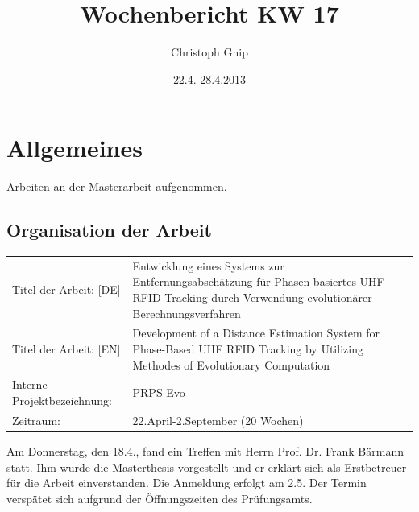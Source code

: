 \documentclass[a4paper,12pt,fleqn]{scrartcl}
\title{Wochenbericht KW 17}
\author{Christoph Gnip}
\date{ 22.4.-28.4.2013 }
\begin{document}
\setlength{\headheight}{36pt}

\begin{titlepage}

\maketitle

\thispagestyle{empty}



\end{titlepage}

\section[Allgemeines]{Allgemeines}
Arbeiten an der Masterarbeit aufgenommen.
\subsection{Organisation der Arbeit}
\begin{table}[right]
    \renewcommand{\arraystretch}{1.5}
    \begin{tabular}{lp{11cm}}
      Titel der Arbeit:  [DE] & Entwicklung eines Systems zur
Entfernungsabschätzung für Phasen basiertes UHF RFID Tracking durch Verwendung
evolutionärer Berechnungsverfahren \\
      Titel der Arbeit:  [EN] & Development of a Distance Estimation System for
Phase-Based UHF RFID Tracking by Utilizing Methodes of Evolutionary Computation
\\
      Interne Projektbezeichnung: & PRPS-Evo      \\
      Zeitraum: & 22.April-2.September (20 Wochen)
    \end{tabular}
\end{table}
%
Am Donnerstag, den 18.4., fand ein Treffen mit Herrn Prof. Dr. Frank Bärmann statt. Ihm wurde die Masterthesis vorgestellt und er erklärt
sich als Erstbetreuer für die Arbeit einverstanden.
\newline
Die Anmeldung erfolgt am 2.5. Der Termin verspätet sich aufgrund der Öffnungszeiten des Prüfungsamts.
\end{document}
